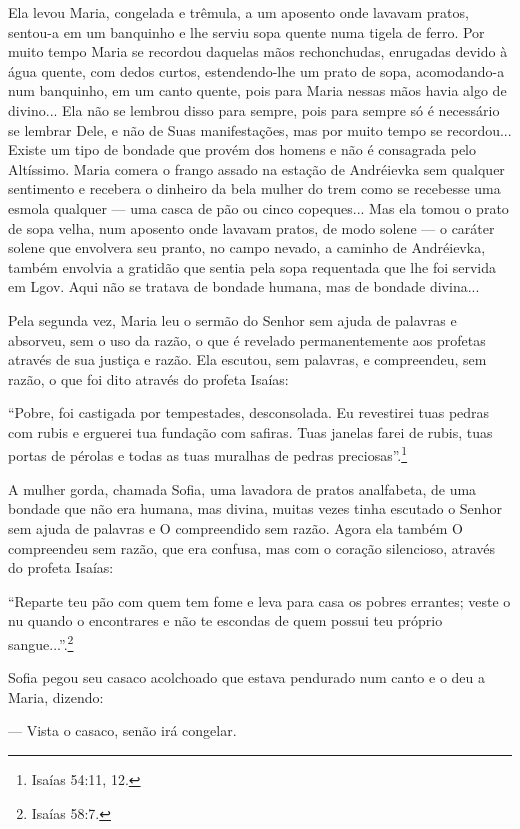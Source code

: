 Ela levou Maria, congelada e trêmula, a um aposento onde lavavam pratos,
sentou-a em um banquinho e lhe serviu sopa quente numa tigela de ferro.
Por muito tempo Maria se recordou daquelas mãos rechonchudas, enrugadas
devido à água quente, com dedos curtos, estendendo-lhe um prato de sopa,
acomodando-a num banquinho, em um canto quente, pois para Maria nessas
mãos havia algo de divino... Ela não se lembrou disso para sempre, pois
para sempre só é necessário se lembrar Dele, e não de Suas
manifestações, mas por muito tempo se recordou... Existe um tipo de
bondade que provém dos homens e não é consagrada pelo Altíssimo. Maria
comera o frango assado na estação de Andréievka sem qualquer sentimento
e recebera o dinheiro da bela mulher do trem como se recebesse uma
esmola qualquer --- uma casca de pão ou cinco copeques... Mas ela tomou
o prato de sopa velha, num aposento onde lavavam pratos, de modo solene
--- o caráter solene que envolvera seu pranto, no campo nevado, a
caminho de Andréievka, também envolvia a gratidão que sentia pela sopa
requentada que lhe foi servida em Lgov. Aqui não se tratava de bondade
humana, mas de bondade divina...

Pela segunda vez, Maria leu o sermão do Senhor sem ajuda de palavras e
absorveu, sem o uso da razão, o que é revelado permanentemente aos
profetas através de sua justiça e razão. Ela escutou, sem palavras, e
compreendeu, sem razão, o que foi dito através do profeta Isaías:

``Pobre, foi castigada por tempestades, desconsolada. Eu revestirei tuas
pedras com rubis e erguerei tua fundação com safiras. Tuas janelas farei
de rubis, tuas portas de pérolas e todas as tuas muralhas de pedras
preciosas''.\footnote{Isaías 54:11, 12.}

A mulher gorda, chamada Sofia, uma lavadora de pratos analfabeta, de uma
bondade que não era humana, mas divina, muitas vezes tinha escutado o
Senhor sem ajuda de palavras e O compreendido sem razão. Agora ela
também O compreendeu sem razão, que era confusa, mas com o coração
silencioso, através do profeta Isaías:

``Reparte teu pão com quem tem fome e leva para casa os pobres errantes;
veste o nu quando o encontrares e não te escondas de quem possui teu
próprio sangue...''.\footnote{Isaías 58:7.}

Sofia pegou seu casaco acolchoado que estava pendurado num canto e o deu
a Maria, dizendo:

--- Vista o casaco, senão irá congelar.

